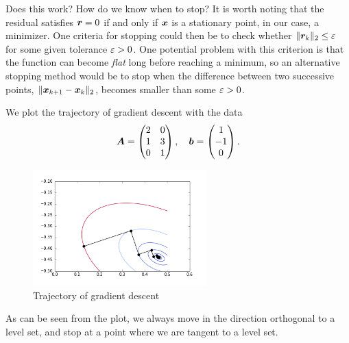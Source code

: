 Does this work? How do we know when to stop? It is worth noting that the residual satisfies $\bm{r}=0$ if and only if $\bm{x}$ is a stationary point, in our case, a minimizer. One criteria for stopping could then be to check whether $\Vert {\bm{r}_k}\Vert_2\leq \varepsilon$ for some given tolerance $\varepsilon>0$. One potential problem with this criterion is that the function can become {\em flat} long before reaching a minimum, so an alternative stopping method would be to stop when the difference between two successive points, $\Vert {\bm{x}_{k+1}-\bm{x}_k}\Vert_2$, becomes smaller than some $\varepsilon>0$.

\begin{example}
We plot the trajectory of gradient descent with the data
\begin{equation*}
\bm{A} = \begin{pmatrix}
2 & 0\\
1 & 3\\
0 & 1
\end{pmatrix}, \quad
\bm{b} = \begin{pmatrix}
1\\ -1\\ 0
\end{pmatrix}.
\end{equation*}

\begin{figure}[h!]
\centering
\includegraphics[width=0.6\textwidth]{images/graddescent.png}
\caption{Trajectory of gradient descent}
\end{figure}
As can be seen from the plot, we always move in the direction orthogonal to a level set, and stop at a point where we are tangent to a level set.
\end{example}

